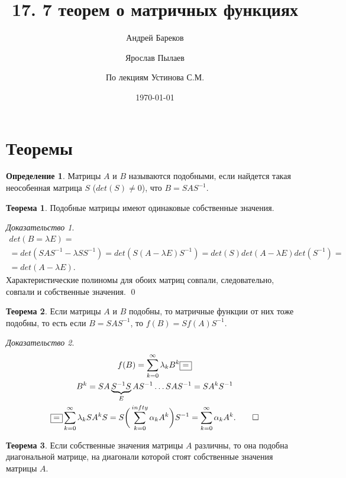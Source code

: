 \documentclass[a4paper,11pt]{article}
\title{17. 7 теорем о матричных функциях}
\author{Андрей Бареков \and Ярослав Пылаев \and По лекциям Устинова С.М.}
\date{\today}
\theoremstyle{definition}
\newtheorem{definition}{Определение}
\newtheorem{theorem}{Теорема}
\theoremstyle{remark}
\newtheorem*{evidence}{Доказательство}
\begin{document}
\maketitle
\newpage

\section{Теоремы}
\begin{definition}
  Матрицы $A$ и $B$ называются подобными, если найдется такая неособенная матрица $S$ ($det(S)\ne 0$), что
  $B=SAS^{-1}$.
\end{definition}
\begin{theorem}
  Подобные матрицы имеют одинаковые собственные значения.
\end{theorem}
\begin{evidence}
  \begin{gather*}
    det(B=\lambda E) = \\
    = det(SAS^{-1}-\lambda SS^{-1}) = det(S(A-\lambda E)S^{-1}) = det(S) det(A-\lambda E)det(S^{-1}) = \\
    = det(A-\lambda E).
  \end{gather*}
  Характеристические полиномы для обоих матриц совпали, следовательно, совпали и собственные значения.     \qed
\end{evidence}
\begin{theorem}
  Если матрицы $A$ и $B$ подобны, то матричные функции от них тоже подобны, то есть если $B=SAS^{-1}$, то $f(B)=Sf(A)S^{-1}$.
\end{theorem}
\begin{evidence}
  \begin{gather*}
    f(B) = \sum_{k=0}^{\infty}\lambda_kB^k \boxed{=} \\
    B^k = SA\underbrace{S^{-1}S}_{E}AS^{-1} \dots SAS^{-1} = SA^kS^{-1} \\
    \boxed{=} \sum_{k=0}^{\infty}\lambda_kSA^kS = S\bigg(\sum_{k=0}^{infty}\alpha_kA^k\bigg)S^{-1} = \sum_{k=0}^{\infty}\alpha_kA^k.     \qed %
  \end{gather*}
\end{evidence}
\begin{theorem}
  Если собственные значения матрицы $A$ различны, то она подобна диагональной матрице, на диагонали которой стоят собственные значения матрицы $A$.
\end{theorem}
\end{document}
